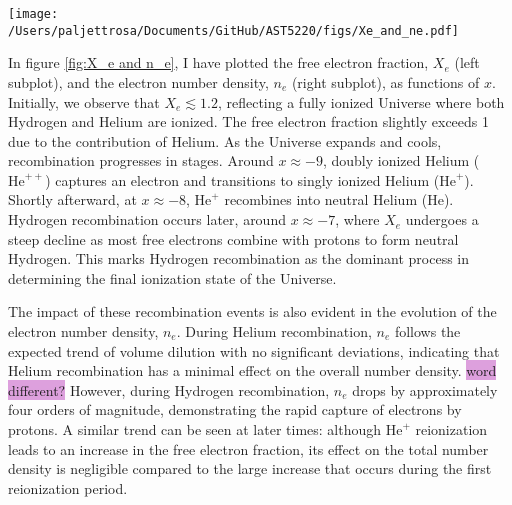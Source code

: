 \documentclass{aa}
\numberwithin{equation}{section}
\numberwithin{table}{section}
\numberwithin{figure}{section}
\begin{document}
\begin{figure*}
  \centering
  \texttt{[image: /Users/paljettrosa/Documents/GitHub/AST5220/figs/Xe\_and\_ne.pdf]}
  \caption{The evolution of the free electron fraction $X_e$ (left) and the free electron number density $n_e$ (right) as functions of $x = \log(a)$. The dashed blue line marks the time of recombination estimated using only the Saha approximation, while the solid line shows the result from solving the Peebles equation. The significant difference illustrates the limitations of assuming equilibrium. 
  }\label{fig:X_e and n_e}
\end{figure*}

In figure \ref{fig:X_e and n_e}, I have plotted the free electron fraction, $X_e$ (left subplot), and the electron number density, $n_e$ (right subplot), as functions of $x$. Initially, we observe that $X_e \lesssim 1.2$, reflecting a fully ionized Universe where both Hydrogen and Helium are ionized. The free electron fraction slightly exceeds 1 due to the contribution of Helium. As the Universe expands and cools, recombination progresses in stages. Around $x \approx -9$, doubly ionized Helium ($\text{He}^{++}$) captures an electron and transitions to singly ionized Helium ($\text{He}^+$). Shortly afterward, at $x \approx -8$, $\text{He}^{+}$ recombines into neutral Helium ($\text{He}$). Hydrogen recombination occurs later, around $x \approx -7$, where $X_e$ undergoes a steep decline as most free electrons combine with protons to form neutral Hydrogen. This marks Hydrogen recombination as the dominant process in determining the final ionization state of the Universe.

The impact of these recombination events is also evident in the evolution of the electron number density, $n_e$. During Helium recombination, $n_e$ follows the expected trend of volume dilution with no significant deviations, indicating that Helium recombination has a minimal effect on the overall number density. \colorbox{Plum}{word different?} However, during Hydrogen recombination, $n_e$ drops by approximately four orders of magnitude, demonstrating the rapid capture of electrons by protons. A similar trend can be seen at later times: although $\text{He}^{+}$ reionization leads to an increase in the free electron fraction, its effect on the total number density is negligible compared to the large increase that occurs during the first reionization period.
\end{document}
